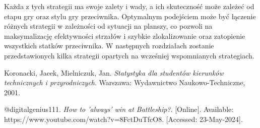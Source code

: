 \documentclass[magisterska]{pracadypl}
\begin{document}
Każda z tych strategii ma swoje zalety i wady, a ich skuteczność może zależeć od etapu gry oraz stylu gry przeciwnika. 
Optymalnym podejściem może być łączenie różnych strategii w zależności od sytuacji na planszy, 
co pozwoli na maksymalizację efektywności strzałów i szybkie zlokalizowanie oraz zatopienie wszystkich statków przeciwnika. 
W następnych rozdziałach zostanie przedstawionych kilka strategii opartych na wcześniej wspomnianych strategiach.
\begin{thebibliography}{9}
  
  Koronacki, Jacek, Mielniczuk, Jan. 
  \textit{Statystyka dla studentów kierunków technicznych i przyrodniczych}. 
  Warszawa: Wydawnictwo Naukowo-Techniczne, 2001.
  
  @digitalgenius111. 
  \textit{How to 'always' win at Battleship?}. 
  [Online]. Available: https://www.youtube.com/watch?v=8FctDuTfcO8. 
  [Accessed: 23-May-2024].
  
  \end{thebibliography}
  
\end{document}
